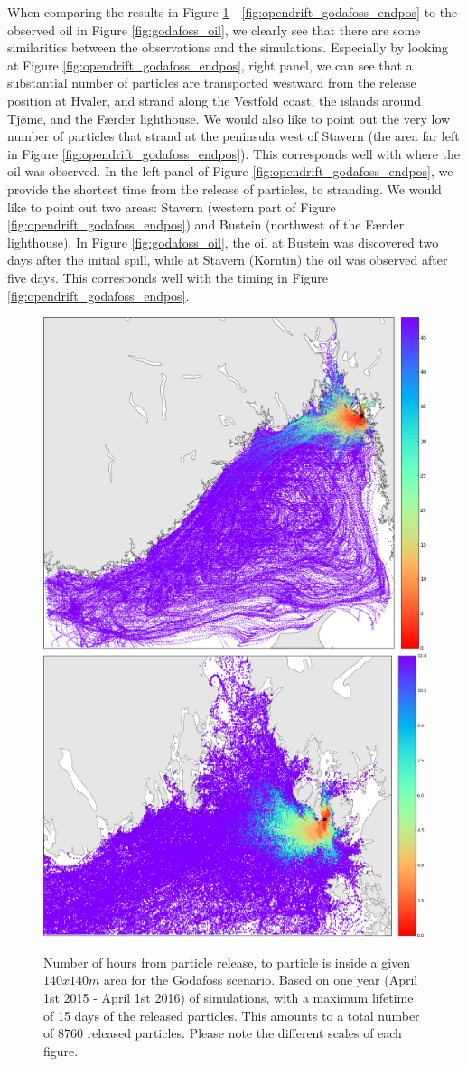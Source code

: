 When comparing the results in Figure \ref{fig:opendrift_godafoss_time} - \ref{fig:opendrift_godafoss_endpos} to the observed oil in Figure \ref{fig:godafoss_oil}, we clearly see that there are some similarities between the observations and the simulations. Especially by looking at Figure \ref{fig:opendrift_godafoss_endpos}, right panel, we can see that a substantial number of particles are transported westward from the release position at Hvaler, and strand along the Vestfold coast, the islands around Tj{\o}me, and the F{\ae}rder lighthouse. We would also like to point out the very low number of particles that strand at the peninsula west of Stavern (the area far left in Figure \ref{fig:opendrift_godafoss_endpos}). This corresponds well with where the oil was observed.
In the left panel of Figure \ref{fig:opendrift_godafoss_endpos}, we provide the shortest time from the release of particles, to stranding. We would like to point out two areas: Stavern (western part of Figure 
\ref{fig:opendrift_godafoss_endpos}) and Bustein (northwest of the F{\ae}rder lighthouse). In Figure \ref{fig:godafoss_oil}, the oil at Bustein was discovered two days after the initial spill, while at Stavern (Korntin) the oil was observed after five days. This corresponds well with the timing in Figure \ref{fig:opendrift_godafoss_endpos}.

\begin{figure}[ht]
\centerline{
\includegraphics*[width=.5\textwidth]{Figurer/opendrift/opendrift_godafoss_shortest_time_crop}
\includegraphics*[width=.5\textwidth]{Figurer/opendrift/opendrift_godafoss_shortest_time_zoom_crop}
}
\caption{\small
Number of hours from particle release, to particle is inside a given $140x140m$ area for the Godafoss scenario. Based on one year (April 1st 2015 - April 1st 2016) of simulations, with a maximum lifetime of 15 days of the released particles. This amounts to a total number of $8760$ released particles. Please note the different scales of each figure.}
\label{fig:opendrift_godafoss_time}
\end{figure}

